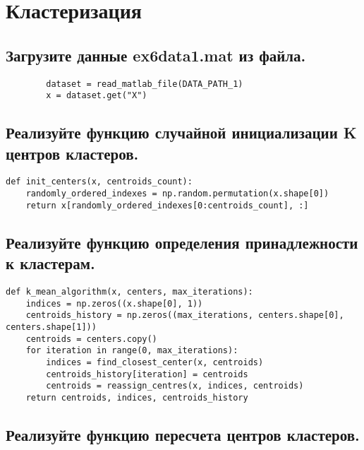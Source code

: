 







\section{Кластеризация}
\label{sec:purpose}



\subsection{Загрузите данные ex6data1.mat из файла.}

\begin{lstlisting}
        dataset = read_matlab_file(DATA_PATH_1)
        x = dataset.get("X")
\end{lstlisting}

\subsection{Реализуйте функцию случайной инициализации K центров кластеров.}

\begin{lstlisting}
def init_centers(x, centroids_count):
    randomly_ordered_indexes = np.random.permutation(x.shape[0])
    return x[randomly_ordered_indexes[0:centroids_count], :]
\end{lstlisting}

\subsection{Реализуйте функцию определения принадлежности к кластерам.}

\begin{lstlisting}
def k_mean_algorithm(x, centers, max_iterations):
    indices = np.zeros((x.shape[0], 1))
    centroids_history = np.zeros((max_iterations, centers.shape[0], centers.shape[1]))
    centroids = centers.copy()
    for iteration in range(0, max_iterations):
        indices = find_closest_center(x, centroids)
        centroids_history[iteration] = centroids
        centroids = reassign_centres(x, indices, centroids)
    return centroids, indices, centroids_history
\end{lstlisting}

\subsection{Реализуйте функцию пересчета центров кластеров.}

